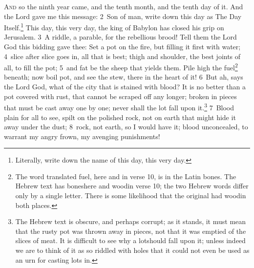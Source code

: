\documentclass[10pt]{book} %
\begin{document}
\lettrine[lines=2]{A}{nd} so the ninth year came, and the tenth month, and the tenth day of it. And the Lord gave me this message: \textcolor{benred8}{2}~Son of man, write down this day as The Day Itself.\footnote[1]{Literally, \textasciigrave write down the name of this day, this very day\textquotesingle .} This day, this very day, the king of Babylon has closed his grip on Jerusalem. \textcolor{benred8}{3}~A riddle, a parable, for the rebellious brood! Tell them the Lord God this bidding gave thee: Set a pot on the fire, but filling it first with water; \textcolor{benred8}{4}~slice after slice goes in, all that is best; thigh and shoulder, the best joints of all, to fill the pot; \textcolor{benred8}{5}~and fat be the sheep that yields them. Pile high the fuel\footnote[2]{The word translated \textasciigrave fuel\textquotesingle , here and in verse 10, is in the Latin \textasciigrave bones\textquotesingle . The Hebrew text has \textasciigrave bones\textquotesingle  here and \textasciigrave wood\textquotesingle  in verse 10; the two Hebrew words differ only by a single letter. There is some likelihood that the original had \textasciigrave wood\textquotesingle  in both places.} beneath; now boil pot, and see the stew, there in the heart of it! \textcolor{benred8}{6}~But ah, says the Lord God, what of the city that is stained with blood? It is no better than a pot covered with rust, that cannot be scraped off any longer; broken in pieces that must be cast away one by one; never shall the lot fall upon it.\footnote[3]{The Hebrew text is obscure, and perhaps corrupt; as it stands, it must mean that the rusty pot was thrown away in pieces, not that it was emptied of the slices of meat. It is difficult to see why a \textasciigrave lot\textquotesingle  should fall upon it; unless indeed we are to think of it as so riddled with holes that it could not even be used as an urn for casting lots in.} \textcolor{benred8}{7}~Blood plain for all to see, spilt on the polished rock, not on earth that might hide it away under the dust; \textcolor{benred8}{8}~rock, not earth, so I would have it; blood unconcealed, to warrant my angry frown, my avenging punishments!
\end{document}

